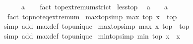 \begin{isabellebody}
\ \ {\isachardoublequoteopen}{\isasymnot}\ {\isasymtop}\ {\isacharless}{\kern0pt}\ a{\isachardoublequoteclose}\isanewline
%
\isadelimproof
\ \ %
\endisadelimproof
%
\isatagproof
{}\isamarkupfalse%
\ {\isacharparenleft}{\kern0pt}fact\ top{\isachardot}{\kern0pt}extremum{\isacharunderscore}{\kern0pt}strict{\isacharparenright}{\kern0pt}%
\endisatagproof
{\isafoldproof}%
%
\isadelimproof
\isanewline
%
\endisadelimproof
\isanewline
{}\isamarkupfalse%
\ less{\isacharunderscore}{\kern0pt}top{\isacharcolon}{\kern0pt}\isanewline
\ \ {\isachardoublequoteopen}a\ {\isasymnoteq}\ {\isasymtop}\ {\isasymlongleftrightarrow}\ a\ {\isacharless}{\kern0pt}\ {\isasymtop}{\isachardoublequoteclose}\isanewline
%
\isadelimproof
\ \ %
\endisadelimproof
%
\isatagproof
{}\isamarkupfalse%
\ {\isacharparenleft}{\kern0pt}fact\ top{\isachardot}{\kern0pt}not{\isacharunderscore}{\kern0pt}eq{\isacharunderscore}{\kern0pt}extremum{\isacharparenright}{\kern0pt}%
\endisatagproof
{\isafoldproof}%
%
\isadelimproof
\isanewline
%
\endisadelimproof
\isanewline
{}\isamarkupfalse%
\ max{\isacharunderscore}{\kern0pt}top{\isacharbrackleft}{\kern0pt}simp{\isacharbrackright}{\kern0pt}{\isacharcolon}{\kern0pt}\ {\isachardoublequoteopen}max\ top\ x\ {\isacharequal}{\kern0pt}\ top{\isachardoublequoteclose}\isanewline
%
\isadelimproof
%
\endisadelimproof
%
\isatagproof
{}\isamarkupfalse%
{\isacharparenleft}{\kern0pt}simp\ add{\isacharcolon}{\kern0pt}\ max{\isacharunderscore}{\kern0pt}def\ top{\isacharunderscore}{\kern0pt}unique{\isacharparenright}{\kern0pt}%
\endisatagproof
{\isafoldproof}%
%
\isadelimproof
\isanewline
%
\endisadelimproof
\isanewline
{}\isamarkupfalse%
\ max{\isacharunderscore}{\kern0pt}top{}{\isacharbrackleft}{\kern0pt}simp{\isacharbrackright}{\kern0pt}{\isacharcolon}{\kern0pt}\ {\isachardoublequoteopen}max\ x\ top\ {\isacharequal}{\kern0pt}\ top{\isachardoublequoteclose}\isanewline
%
\isadelimproof
%
\endisadelimproof
%
\isatagproof
{}\isamarkupfalse%
{\isacharparenleft}{\kern0pt}simp\ add{\isacharcolon}{\kern0pt}\ max{\isacharunderscore}{\kern0pt}def\ top{\isacharunderscore}{\kern0pt}unique{\isacharparenright}{\kern0pt}%
\endisatagproof
{\isafoldproof}%
%
\isadelimproof
\isanewline
%
\endisadelimproof
\isanewline
{}\isamarkupfalse%
\ min{\isacharunderscore}{\kern0pt}top{\isacharbrackleft}{\kern0pt}simp{\isacharbrackright}{\kern0pt}{\isacharcolon}{\kern0pt}\ {\isachardoublequoteopen}min\ top\ x\ {\isacharequal}{\kern0pt}\ x{\isachardoublequoteclose}\isanewline
%
\isadelimproof

\end{isabellebody}
